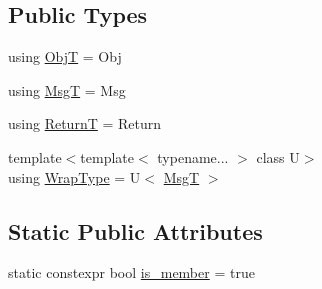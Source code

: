 \subsection*{Public Types}
\begin{DoxyCompactItemize}
\item 
using \hyperlink{structvt_1_1util_1_1fntraits_1_1detail_1_1_obj_func_traits_impl_3_01std_1_1enable__if__t_3_01stdc67616d674616ce71c363c0e039ceb56_a6b9210c366bdac4e516816ddcc87d5d5}{ObjT} = Obj
\item 
using \hyperlink{structvt_1_1util_1_1fntraits_1_1detail_1_1_obj_func_traits_impl_3_01std_1_1enable__if__t_3_01stdc67616d674616ce71c363c0e039ceb56_aa7f18dbe6abef9456e082ead8aadb75e}{MsgT} = Msg
\item 
using \hyperlink{structvt_1_1util_1_1fntraits_1_1detail_1_1_obj_func_traits_impl_3_01std_1_1enable__if__t_3_01stdc67616d674616ce71c363c0e039ceb56_addb327d4046476d87f16855428fd5726}{ReturnT} = Return
\item 
{\footnotesize template$<$template$<$ typename... $>$ class U$>$ }\\using \hyperlink{structvt_1_1util_1_1fntraits_1_1detail_1_1_obj_func_traits_impl_3_01std_1_1enable__if__t_3_01stdc67616d674616ce71c363c0e039ceb56_a53fe3b9f20ec1f653cc829457c4fabcd}{Wrap\+Type} = U$<$ \hyperlink{structvt_1_1util_1_1fntraits_1_1detail_1_1_obj_func_traits_impl_3_01std_1_1enable__if__t_3_01stdc67616d674616ce71c363c0e039ceb56_aa7f18dbe6abef9456e082ead8aadb75e}{MsgT} $>$
\end{DoxyCompactItemize}
\subsection*{Static Public Attributes}
\begin{DoxyCompactItemize}
\item 
static constexpr bool \hyperlink{structvt_1_1util_1_1fntraits_1_1detail_1_1_obj_func_traits_impl_3_01std_1_1enable__if__t_3_01stdc67616d674616ce71c363c0e039ceb56_aa1bd7369a40d4be564d886f95f57ca41}{is\+\_\+member} = true
\end{DoxyCompactItemize}


